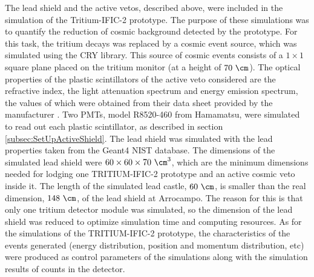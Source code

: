 The lead shield and the active vetos, described above, were included in the simulation of the Tritium-IFIC-2 prototype. The purpose of these simulations was to quantify the reduction of cosmic background detected by the prototype. For this task, the tritium decays was replaced by a cosmic event source, which was simulated using the CRY library. This source of cosmic events consists of a $1 \times 1$ square plane placed on the tritium monitor (at a height of $70~\cm$). The optical properties of the plastic scintillators of the active veto considered are the refractive index, the light attenuation spectrum and energy emission spectrum, the values of which were obtained from their data sheet provided by the manufacturer \cite{ScintillatorVeto}. Two PMTs, model R8520-460 from Hamamatsu, were simulated to read out each plastic scintillator, as described in section \ref{subsec:SetUpActiveShield}. The lead shield was simulated with the lead properties taken from the Geant4 NIST database. The dimensions of the simulated lead shield were $60 \times 60 \times 70~\cm^3$, which are the minimum dimensions needed for lodging one TRITIUM-IFIC-2 prototype and  an active cosmic veto inside it. The length of the simulated lead castle, $60~\cm$, is smaller than the real dimension, $148~\cm$, of the lead shield at Arrocampo. The reason for this is that only one tritium detector module was simulated, so the dimension of the lead shield was reduced to optimize simulation time and computing resources. As for the simulations of the TRITIUM-IFIC-2 prototype, the characteristics of the events generated (energy distribution, position and momentum distribution, etc) were produced as control parameters of the simulations along with the simulation results of counts in the detector.

